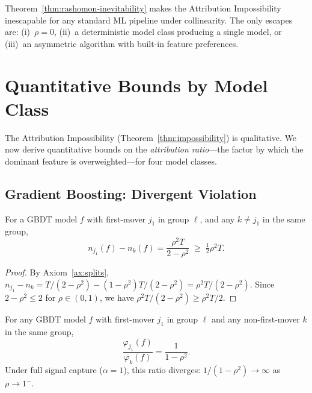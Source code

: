 \documentclass{jmlr}
\newcommand{\GBDT}{\textsc{GBDT}}
\begin{document}
\begin{remark}
Theorem~\ref{thm:rashomon-inevitability} makes the Attribution Impossibility inescapable for any standard ML pipeline under collinearity. The only escapes are: (i)~$\rho = 0$, (ii)~a deterministic model class producing a single model, or (iii)~an asymmetric algorithm with built-in feature preferences.
\end{remark}


\section{Quantitative Bounds by Model Class}
\label{sec:bounds}

The Attribution Impossibility (Theorem~\ref{thm:impossibility}) is qualitative. We now derive quantitative bounds on the \emph{attribution ratio}---the factor by which the dominant feature is overweighted---for four model classes.

\subsection{Gradient Boosting: Divergent Violation}
\label{sec:gbdt-bounds}

\begin{lemma}
\label{lem:split-gap}
For a \GBDT{} model $f$ with first-mover $j_1$ in group $\ell$, and any $k \neq j_1$ in the same group,
\[
    n_{j_1}(f) - n_k(f) = \frac{\rho^2 T}{2 - \rho^2} \;\geq\; \tfrac{1}{2}\rho^2 T.
\]
\end{lemma}

\begin{proof}
By Axiom~\ref{ax:splits}, $n_{j_1} - n_k = T/(2-\rho^2) - (1-\rho^2)T/(2-\rho^2) = \rho^2 T/(2-\rho^2)$.
Since $2 - \rho^2 \leq 2$ for $\rho \in (0,1)$, we have $\rho^2 T/(2-\rho^2) \geq \rho^2 T/2$.
\end{proof}

\begin{theorem}
\label{thm:ratio}
For any \GBDT{} model $f$ with first-mover $j_1$ in group $\ell$ and any non-first-mover $k$ in the same group,
\[
    \frac{\varphi_{j_1}(f)}{\varphi_k(f)} = \frac{1}{1 - \rho^2}.
\]
Under full signal capture ($\alpha{=}1$), this ratio diverges: $1/(1-\rho^2) \to \infty$ as $\rho \to 1^-$.
\end{theorem}
\end{document}
